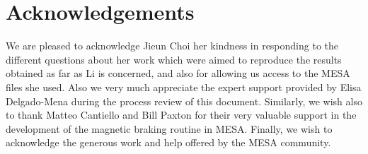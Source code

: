 \documentclass[fleqn,usenatbib]{mnras}
\begin{document}
\section*{Acknowledgements}
We are pleased to acknowledge Jieun Choi her kindness in responding to the different questions about her work which were aimed to reproduce the results obtained as far as Li is concerned, and also for allowing us access to the MESA files she used. Also we very much appreciate the expert support provided by Elisa Delgado-Mena during the process review of this document. Similarly, we wish also to thank Matteo Cantiello and Bill Paxton for their very valuable support in the development of the magnetic braking routine in MESA. Finally, we wish to acknowledge the generous work and help offered by the MESA community.












\bsp	%
\label{lastpage}
\end{document}
